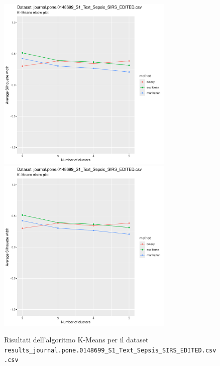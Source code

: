 \documentclass[12pt]{report}
\begin{document}
			\begin{figure}[h]
				\centering
				\includegraphics[width = 0.75\textwidth, height = 0.45\textheight, page = 1]{
					results/results_journal.pone.0148699_S1_Text_Sepsis_SIRS_EDITED.csv.pdf
				}
				\includegraphics[width = 0.75\textwidth, height = 0.45\textheight, page = 2]{
					results/results_journal.pone.0148699_S1_Text_Sepsis_SIRS_EDITED.csv.pdf
				}
				\caption{Risultati dell'algoritmo K-Means per il dataset
				\texttt{results\_journal.pone.0148699\_S1\_Text\_Sepsis\_SIRS\_EDITED.csv.csv}}
				\label{fig:kmeans5}
			\end{figure}
\end{document}
